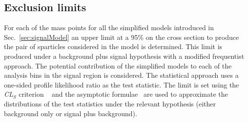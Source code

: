 
\subsection{Exclusion limits}

For each of the mass points for all the simplified models introduced
in Sec.~\ref{sec:signalModel} an upper limit at a 95\% \CL on the
cross section to produce the pair of sparticles considered in the
model is determined. This limit is produced under a background plus
signal hypothesis with a modified frequentist approach. The potential
contribution of the simplified models to each of the analysis bins in
the signal region is considered. The statistical approach uses a
one-sided profile likelihood ratio as the test statistic. The limit is
set using the \emph{CL$_S$} criterion ~\cite{junk, read} and the
asymptotic formulae~\cite{Cowan:2010js} are used to approximate the
distributions of the test statistics under the relevant hypothesis
(either background only or signal plus background). 

